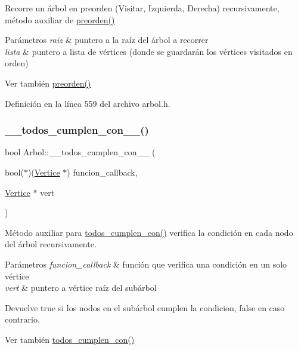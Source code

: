 Recorre un árbol en preorden (Visitar, Izquierda, Derecha) recursivamente, método auxiliar de \hyperlink{classArbol_a0ffdc60ce8f2267366681cc94cf6beea}{preorden()} 


\begin{DoxyParams}{Parámetros}
{\em raiz} & puntero a la raíz del árbol a recorrer \\
\hline
{\em lista} & puntero a lista de vértices (donde se guardarán los vértices visitados en orden) \\
\hline
\end{DoxyParams}
\begin{DoxySeeAlso}{Ver también}
\hyperlink{classArbol_a0ffdc60ce8f2267366681cc94cf6beea}{preorden()} 
\end{DoxySeeAlso}


Definición en la línea 559 del archivo arbol.\+h.

\mbox{\label{classArbol_a60b71d79b81a3a1083709ec264332975}} 
\subsubsection{\texorpdfstring{\+\_\+\+\_\+todos\+\_\+cumplen\+\_\+con\+\_\+\+\_\+()}{\_\_todos\_cumplen\_con\_\_()}}
{\footnotesize\ttfamily bool Arbol\+::\+\_\+\+\_\+todos\+\_\+cumplen\+\_\+con\+\_\+\+\_\+ (\begin{DoxyParamCaption}\item[{bool($\ast$)(\hyperlink{classVertice}{Vertice} $\ast$)}]{funcion\+\_\+callback,  }\item[{\hyperlink{classVertice}{Vertice} $\ast$}]{vert }\end{DoxyParamCaption})\hspace{0.3cm}{\ttfamily [protected]}}



Método auxiliar para \hyperlink{classArbol_aba4b09fef18152beb43e04fee7394f34}{todos\+\_\+cumplen\+\_\+con()} verifica la condición en cada nodo del árbol recursivamente. 


\begin{DoxyParams}{Parámetros}
{\em funcion\+\_\+callback} & función que verifica una condición en un solo vértice \\
\hline
{\em vert} & puntero a vértice raíz del subárbol \\
\hline
\end{DoxyParams}
\begin{DoxyReturn}{Devuelve}
true si los nodos en el subárbol cumplen la condicion, false en caso contrario. 
\end{DoxyReturn}
\begin{DoxySeeAlso}{Ver también}
\hyperlink{classArbol_aba4b09fef18152beb43e04fee7394f34}{todos\+\_\+cumplen\+\_\+con()} 
\end{DoxySeeAlso}



